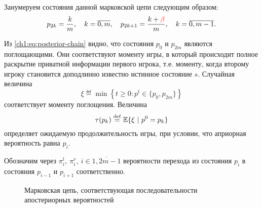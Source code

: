 {Занумеруем состояния данной марковской цепи следующим образом:
\begin{gather*}
  p_{2k} = \frac{k}{m}, \quad k = \overline{0, m}, \quad
  p_{2k+1} = \frac{k+\textcolor{red}{\beta}}{m}, \quad k = \overline{0, m-1}.
\end{gather*}

Из \eqref{ch1:eq:posterior-chain} видно, что состояния $p_0$ и $p_{2m}$ являются поглощающими.
Они соответствуют моменту игры, в который происходит полное раскрытие приватной информации первого игрока, т.е. моменту, когда второму игроку становится доподлинно известно истинное состояние $s$.
Случайная величина
\begin{equation*}
  \xi \eqdef \min \left\{ t \geq 0: p^t \in \{p_0, p_{2m}\} \right\}
\end{equation*}
соответствует моменту поглощения. Величина
\begin{equation*}
  \tau(p_k) \overset{\mathrm{def}}{=} \operatorname{\mathbb{E}} \{ \xi\ |\ p^0 = p_k \}
\end{equation*}
определяет ожидаемую продолжительность игры, при условии, что априорная вероятность равна $p_i$.

Обозначим через $\pi^l_i,\ \pi^r_i,\ i \in \overline{1, 2m-1}$ вероятности перехода из состояния $p_i$ в состояния $p_{i-1}$ и $p_{i+1}$ соответственно.

\begin{figure}[tb]
  \centering
  
  \caption[Последовательность апостериорных вероятностей]{Марковская цепь,
    соответствующая последовательности апостериорных вероятностей}
  \label{ch1:fig:posterior-markov}
\end{figure}

}
